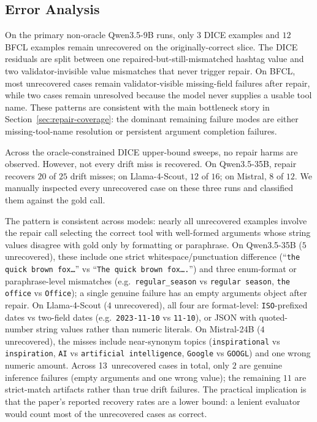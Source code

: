 \documentclass{svproc}
\begin{document}
\subsection{Error Analysis}
\label{sec:error-analysis}
On the primary non-oracle Qwen3.5-9B runs, only $3$ DICE examples and $12$ BFCL
examples remain unrecovered on the originally-correct slice. The DICE residuals are
split between one repaired-but-still-mismatched hashtag value and two
validator-invisible value mismatches that never trigger repair. On BFCL, most
unrecovered cases remain validator-visible missing-field failures after repair,
while two cases remain unresolved because the model never supplies a usable tool
name. These patterns are consistent with the main bottleneck story in
Section~\ref{sec:repair-coverage}: the dominant remaining failure modes are either
missing-tool-name resolution or persistent argument completion failures.

Across the oracle-constrained DICE upper-bound sweeps, no repair harms are observed.
However, not every drift miss is recovered. On Qwen3.5-35B, repair recovers $20$ of
$25$ drift misses; on Llama-4-Scout, $12$ of $16$; on Mistral, $8$ of $12$. We
manually inspected every unrecovered case on these three runs and classified them
against the gold call.

The pattern is consistent across models: nearly all unrecovered examples
involve the repair call selecting the correct tool with well-formed arguments
whose string values disagree with gold only by formatting or paraphrase. On
Qwen3.5-35B ($5$ unrecovered), these include one strict whitespace/punctuation
difference (``\texttt{the quick brown fox\ldots}'' vs
``\texttt{The quick brown fox\ldots.}'') and three enum-format or
paraphrase-level mismatches (e.g.\ \texttt{regular\_season} vs
\texttt{regular season}, \texttt{the office} vs \texttt{Office}); a single
genuine failure has an empty arguments object after repair. On Llama-4-Scout
($4$ unrecovered), all four are format-level: \texttt{ISO}-prefixed dates
vs two-field dates (e.g.\ \texttt{2023-11-10} vs \texttt{11-10}), or JSON
with quoted-number string values rather than numeric literals. On Mistral-24B
($4$ unrecovered), the misses include near-synonym topics (\texttt{inspirational}
vs \texttt{inspiration}, \texttt{AI} vs \texttt{artificial intelligence},
\texttt{Google} vs \texttt{GOOGL}) and one wrong numeric amount. Across
13~unrecovered cases in total, only $2$ are genuine inference failures
(empty arguments and one wrong value); the remaining $11$ are strict-match
artifacts rather than true drift failures. The practical implication is that
the paper's reported recovery rates are a lower bound: a lenient evaluator
would count most of the unrecovered cases as correct.
\end{document}
